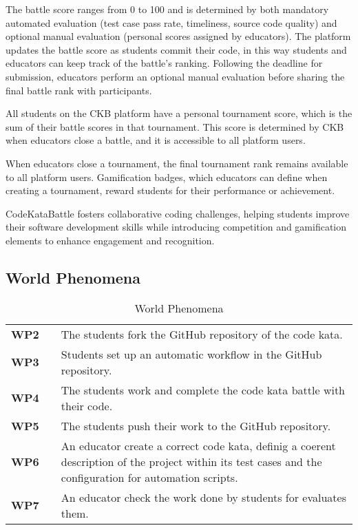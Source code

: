 The battle score ranges from 0 to 100 and is determined by both mandatory automated evaluation (test case pass rate, timeliness, source code quality) and optional manual evaluation (personal scores assigned by educators).
The platform updates the battle score as students commit their code, in this way students and educators can keep track of the battle's ranking.
Following the deadline for submission, educators perform an optional manual evaluation before sharing the final battle rank with participants.

All students on the CKB platform have a personal tournament score, which is the sum of their battle scores in that tournament.
This score is determined by CKB when educators close a battle, and it is accessible to all platform users.

When educators close a tournament, the final tournament rank remains available to all platform users.
Gamification badges, which educators can define when creating a tournament, reward students for their performance or achievement.

CodeKataBattle fosters collaborative coding challenges, helping students improve their software development skills while introducing competition and gamification elements to enhance engagement and recognition.

\subsection{World Phenomena}

\begin{table}[H]
    \centering
    \renewcommand{\arraystretch}{1.5}
    \begin{tabular}{l l p{12cm}}
        \hline
        \textbf{WP2} &  & The students fork the GitHub repository of the code kata. \\
        \textbf{WP3} &  & Students set up an automatic workflow in the GitHub repository. \\
        \textbf{WP4} &  & The students work and complete the code kata battle with their code. \\
        \textbf{WP5} &  & The students push their work to the GitHub repository. \\
        \textbf{WP6} &  & An educator create a correct code kata, definig a coerent description of the project within its test cases and the configuration for automation scripts. \\
        \textbf{WP7} &  & An educator check the work done by students for evaluates them. \\
        \hline
    \end{tabular}
    \caption{World Phenomena}
\end{table}

